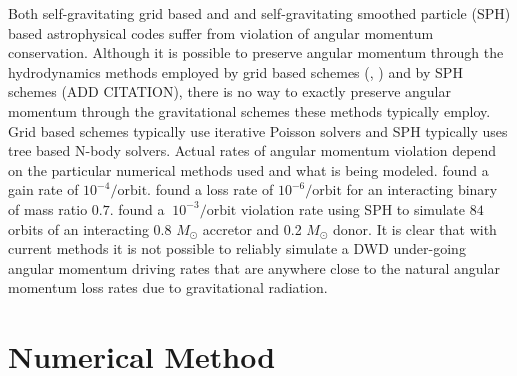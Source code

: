 \documentclass[preprint]{aastex}
\begin{document}
Both self-gravitating grid based and and self-gravitating smoothed particle (SPH) based astrophysical codes suffer from violation of angular momentum conservation. Although it is 
possible to preserve angular momentum through the hydrodynamics methods employed by grid based schemes (\cite{BATM2014}, \cite{DL2015}) and by SPH schemes (ADD CITATION), there is no way to 
exactly preserve angular momentum
through the gravitational schemes these methods typically employ. Grid based schemes typically use iterative Poisson solvers and SPH typically uses tree based N-body solvers.
Actual rates of angular momentum violation depend on the particular numerical methods used and what is being modeled.  \cite{MTF2002} found a gain rate of $10^{-4} / \mathrm{orbit}$.
\cite{MT2012} found a loss rate of $10^{-6} / \mathrm{orbit}$ for an interacting binary of mass ratio $0.7$.
\cite{DRGR2011} found a $~10^{-3} / \mathrm{orbit}$ violation rate using SPH to simulate $84$ orbits of an interacting 0.8 $M_{\odot}$ accretor and 0.2 $M_{\odot}$ donor. It is clear that with current
methods it is not possible to reliably simulate a DWD under-going angular momentum driving rates that are anywhere close to the natural angular momentum loss rates due to gravitational radiation.



\section{Numerical Method}
\end{document}
